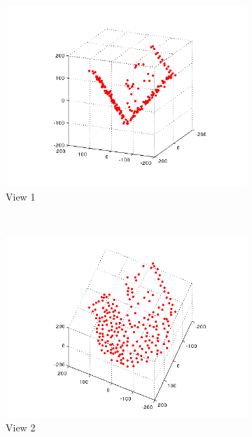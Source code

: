 \documentclass[a4paper,10pt]{article}
\begin{document}
\begin{figure}[h!tb]

        \centering
        \begin{subfigure}{0.3\textwidth}
                \centering
                \includegraphics[width=\textwidth]{EuclideanStructure1}
                \caption{View 1}
        \end{subfigure}
        ~
        \begin{subfigure}{0.3\textwidth}
                \centering
                \includegraphics[width=\textwidth]{EuclideanStructure2}
                \caption{View 2}
        \end{subfigure}
        ~
        \begin{subfigure}{0.3\textwidth}

\end{subfigure}
\end{figure}
\end{document}
